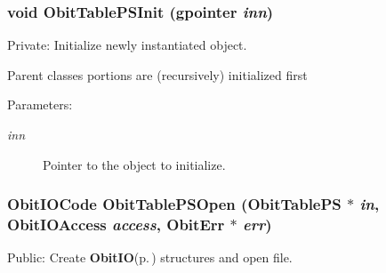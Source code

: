 \subsubsection{\setlength{\rightskip}{0pt plus 5cm}void Obit\-Table\-PSInit (gpointer {\em inn})}\label{ObitTablePS_8c_a8}


Private: Initialize newly instantiated object. 

Parent classes portions are (recursively) initialized first \begin{Desc}
\item[Parameters:]
\begin{description}
\item[{\em inn}]Pointer to the object to initialize. \end{description}
\end{Desc}
\subsubsection{\setlength{\rightskip}{0pt plus 5cm}Obit\-IOCode Obit\-Table\-PSOpen ({\bf Obit\-Table\-PS} $\ast$ {\em in}, Obit\-IOAccess {\em access}, {\bf Obit\-Err} $\ast$ {\em err})}\label{ObitTablePS_8c_a21}


Public: Create {\bf Obit\-IO}{\rm (p.\,\pageref{structObitIO})} structures and open file. 

